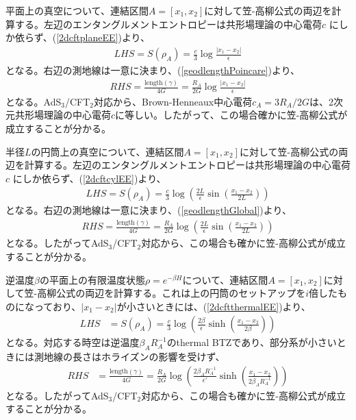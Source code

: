 平面上の真空について、連結区間$A=[x_1,x_2]$に対して笠-高柳公式の両辺を計算する。左辺のエンタングルメントエントロピーは共形場理論の中心電荷$c$
にしか依らず、(\ref{2dcftplaneEE})より、
\begin{align}
LHS=S(\rho_A)=\frac{c}{3}\log\frac{|x_1-x_2|}{\epsilon}
\end{align}
となる。右辺の測地線は一意に決まり、(\ref{geodlengthPoincare})より、
\begin{align}
RHS=\frac{\text{length}(\gamma)}{4G}=\frac{R_A}{2G}\log\frac{|x_1-x_2|}{\epsilon}
\end{align}
となる。AdS$_3$/CFT$_2$対応から、Brown-Henneaux中心電荷$c_A=3R_A/2G$は、2次元共形場理論の中心電荷$c$に等しい。したがって、この場合確かに笠-高柳公式が成立することが分かる。

半径$L$の円筒上の真空について、連結区間$A=[x_1,x_2]$に対して笠-高柳公式の両辺を計算する。左辺のエンタングルメントエントロピーは共形場理論の中心電荷$c$
にしか依らず、(\ref{2dcftcylEE})より、
\begin{align}
LHS=S(\rho_A)=\frac{c}{3}\log \left(\frac{2L}{\epsilon}\sin\left(\frac{x_1-x_2}{2L}\right)\right)
\end{align}
となる。右辺の測地線は一意に決まり、(\ref{geodlengthGlobal})より、
\begin{align}
RHS=\frac{\text{length}(\gamma)}{4G}=\frac{R_A}{2G}\log \left(\frac{2L}{\epsilon}\sin\left(\frac{x_1-x_2}{2L}\right)\right)
\end{align}
となる。したがってAdS$_3$/CFT$_2$対応から、この場合も確かに笠-高柳公式が成立することが分かる。

逆温度$\beta$の平面上の有限温度状態$\rho=e^{-\beta H}$について、連結区間$A=[x_1,x_2]$に対して笠-高柳公式の両辺を計算する。これは上の円筒のセットアップを$i$倍したものになっており、$|x_1-x_2|$が小さいときには、(\ref{2dcftthermalEE})より、
\begin{align}
LHS&=S(\rho_A)=\frac{c}{3}\log\left(\frac{2\beta}{\epsilon}\sinh\left(\frac{x_1-x_2}{2\beta}\right)\right)
\end{align}
となる。対応する時空は逆温度$\beta_AR_A^{-1}$のthermal BTZであり、部分系が小さいときには測地線の長さはホライズンの影響を受けず、
\begin{align}
RHS&=\frac{\text{length}(\gamma)}{4G}=\frac{R_A}{2G}\log \left(\frac{2\beta_AR_A^{-1}}{\epsilon'}\sinh\left(\frac{x_1-x_2}{2\beta_AR_A^{-1}}\right)\right)
\end{align}
となる。したがってAdS$_3$/CFT$_2$対応から、この場合も確かに笠-高柳公式が成立することが分かる。


